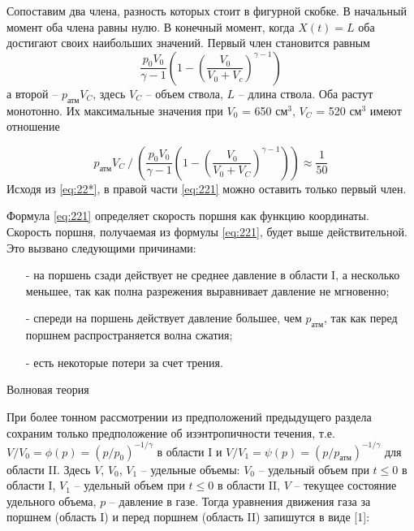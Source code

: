 \documentclass[specialist, subf, href, colorlinks=true, 14pt, final]{disser}
\theoremstyle{definition}
\begin{document}
Сопоставим два члена, разность которых стоит в фигурной скобке. В начальный момент оба члена равны нулю. В конечный момент, когда $X(t) = L$ оба достигают своих наибольших значений. Первый член становится равным
\[
	\frac{p_0V_0}{\gamma -1}\left(1 - \left(\frac{V_0}{V_0 + V_c}\right)^{\displaystyle \gamma -1}\right)
\]
а второй -- $p_{\text{атм}}V_C$, здесь $V_C$ -- объем ствола, $L$ -- длина ствола. Оба растут монотонно. Их максимальные значения при $V_0$ = 650 см$^3$, $V_C$ = 520 см$^3$ имеют отношение
\addtocounter{equation}{1}
\begin{equation}\label{eq:22*}
  p_{\text{атм}} V_{C}\ /\ \left( \frac{p_{0}V_{0}}{\gamma -1}\left(1 - \left(\frac{V_0}{V_0 + V_C}\right)^{\displaystyle \gamma -1} \right)\right) \approx \frac{1}{50} 
  \tag{*}
\end{equation}
Исходя из \eqref{eq:22*}, в правой части \eqref{eq:221} можно оставить только первый член.

Формула \eqref{eq:221} определяет скорость поршня как функцию координаты. Скорость поршня, получаемая из формулы \eqref{eq:221}, будет выше действительной. Это вызвано следующими причинами:
\begin{itemize}
  \item[-] на поршень сзади действует не среднее давление в области
I, а несколько меньшее, так как полна разрежения выравнивает давление не мгновенно;
  \item[-] спереди на поршень действует давление большее, чем $p_{\text{атм}}$, так как перед поршнем распространяется волна сжатия;
  \item[-] есть некоторые потери за счет трения.
\end{itemize}

Волновая теория

При более тонном рассмотрении из предположений предыдущего раздела сохраним только предположение об изэнтропичности течения, т.е. $V/V_0 = \phi(p) = (p/p_0)^{-1/ \gamma}$ в области I и $V/V_1 = \psi(p) = (p/p_{\text{атм}})^{-1/ \gamma} $ для области II. Здесь $V$, $V_0$, $V_1$ -- удельные объемы: $V_0$ -- удельный объем при $t\leqslant 0$ в области I, $V_1$ -- удельный объем при $t\leqslant 0$ в области II, $V$ -- текущее состояние удельного объема, $p$ -- давление в газе. Тогда уравнения движения газа за поршнем (область I) и перед поршнем (область II) запишутся в виде [1]:
\end{document}
